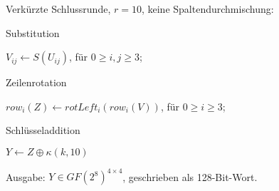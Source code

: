 \documentclass[a4paper]{article}
\begin{document}
\begin{multicols}{3}
\begin{itemize*}
\begin{enumerate*}
\begin{enumerate*}
\begin{itemize*}
                \end{itemize*}
            \end{enumerate*}
            \item  Verkürzte Schlussrunde, $r=10$, keine Spaltendurchmischung:
            \begin{enumerate*}
                \item Substitution
                \begin{itemize*}
                    \item $V_{ij}\leftarrow S(U_{ij})$, für $0\geq i,j\geq 3$;
                \end{itemize*}
                \item  Zeilenrotation
                \begin{itemize*}
                    \item $row_i(Z)\leftarrow rotLeft_i(row_i(V))$, für $0\geq i\geq 3$;
                \end{itemize*}
                \item  Schlüsseladdition
                \begin{itemize*}
                    \item $Y\leftarrow Z\oplus \kappa (k,10)$
                \end{itemize*}
            \end{enumerate*}
            \item  Ausgabe: $Y\in GF(2^8)^{4\times 4}$, geschrieben als 128-Bit-Wort.
        \end{enumerate*}
    \end{itemize*}


\end{multicols}
\end{document}
